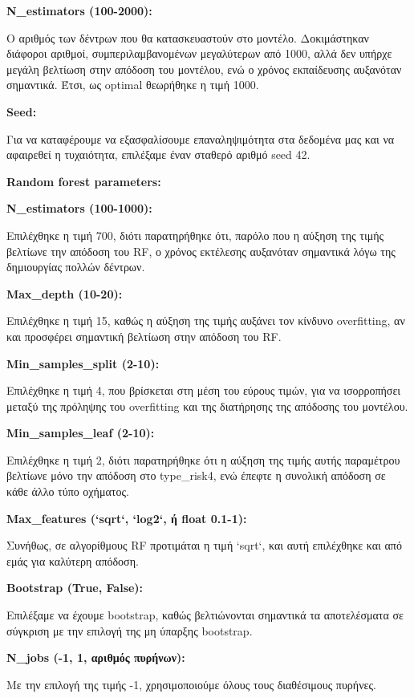 \documentclass{llncs}
\begin{document}
\noindent \textbf{N\_estimators (100-2000):}

Ο αριθμός των δέντρων που θα κατασκευαστούν στο μοντέλο. Δοκιμάστηκαν διάφοροι αριθμοί, συμπεριλαμβανομένων μεγαλύτερων από 1000, αλλά δεν υπήρχε μεγάλη βελτίωση στην απόδοση του μοντέλου, ενώ ο χρόνος εκπαίδευσης αυξανόταν σημαντικά. Έτσι, ως optimal θεωρήθηκε η τιμή 1000.

\noindent \textbf{Seed:}

Για να καταφέρουμε να εξασφαλίσουμε επαναληψιμότητα στα δεδομένα μας και να αφαιρεθεί η τυχαιότητα, επιλέξαμε έναν σταθερό αριθμό seed 42.

\noindent \textbf{Random forest parameters:}


\noindent \textbf{N\_estimators (100-1000):}

Επιλέχθηκε η τιμή 700, διότι παρατηρήθηκε ότι, παρόλο που η αύξηση της τιμής βελτίωνε την απόδοση του RF, ο χρόνος εκτέλεσης αυξανόταν σημαντικά λόγω της δημιουργίας πολλών δέντρων.

\noindent \textbf{Max\_depth (10-20):}

Επιλέχθηκε η τιμή 15, καθώς η αύξηση της τιμής αυξάνει τον κίνδυνο overfitting, αν και προσφέρει σημαντική βελτίωση στην απόδοση του RF.

\noindent \textbf{Min\_samples\_split (2-10):}

Επιλέχθηκε η τιμή 4, που βρίσκεται στη μέση του εύρους τιμών, για να ισορροπήσει μεταξύ της πρόληψης του overfitting και της διατήρησης της απόδοσης του μοντέλου.

\noindent \textbf{Min\_samples\_leaf (2-10):}

Επιλέχθηκε η τιμή 2, διότι παρατηρήθηκε ότι η αύξηση της τιμής αυτής παραμέτρου βελτίωνε μόνο την απόδοση στο type\_risk4, ενώ έπεφτε η συνολική απόδοση σε κάθε άλλο τύπο οχήματος.

\noindent \textbf{Max\_features (`sqrt`, `log2`, ή float 0.1-1):}

Συνήθως, σε αλγορίθμους RF προτιμάται η τιμή `sqrt`, και αυτή επιλέχθηκε και από εμάς για καλύτερη απόδοση.

\noindent \textbf{Bootstrap (True, False):}

Επιλέξαμε να έχουμε bootstrap, καθώς βελτιώνονται σημαντικά τα αποτελέσματα σε σύγκριση με την επιλογή της μη ύπαρξης bootstrap.

\noindent \textbf{N\_jobs (-1, 1, αριθμός πυρήνων):}

Με την επιλογή της τιμής -1, χρησιμοποιούμε όλους τους διαθέσιμους πυρήνες.
\end{document}
